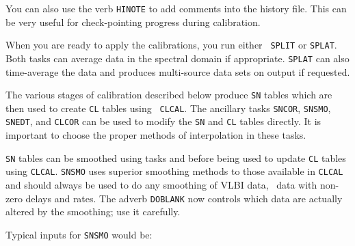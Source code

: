 You can also use the verb {\tt HINOTE} to add comments into the
history file.  This can be very useful for check-pointing progress
during calibration.

When you are ready to apply the calibrations, you run either {\tt
SPLIT} or {\tt SPLAT}.  Both tasks can average data in the spectral
domain if appropriate.  {\tt SPLAT} can also time-average the data and
produces multi-source data sets on output if requested.


The various stages of calibration described below produce {\tt SN}
tables which are then used to create {\tt CL} tables using {\tt
CLCAL}\@.  The ancillary tasks {\tt SNCOR}, {\tt SNSMO}, {\tt SNEDT},
and {\tt CLCOR} can be used to modify the {\tt SN} and {\tt CL} tables
directly.  It is important to choose the proper methods of
interpolation in these tasks.

{\tt SN} tables can be smoothed using tasks {\tt {}} and
{\tt {}} before being used to update {\tt CL} tables using
{\tt CLCAL}\@.  {\tt SNSMO} uses superior smoothing
methods to those available in {\tt CLCAL} and should always be used to
do any smoothing of VLBI data, \ie\ data with non-zero delays and
rates.  The adverb {\tt DOBLANK} now controls which data are actually
altered by the smoothing; use it carefully.

Typical inputs for {\tt SNSMO} would be:
\pd

